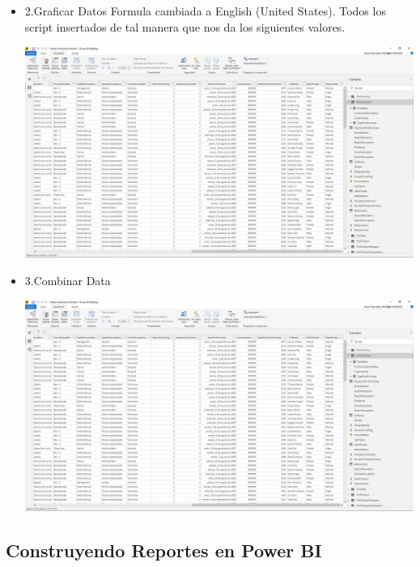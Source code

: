\begin{itemize}
 \item 2.Graficar Datos
Formula cambiada a English (United States). Todos los script insertados de tal manera que nos da los siguientes valores.
	\begin{center}
	\includegraphics[width=18cm]{./Imagenes/Imagen3}
	\end{center}	

 \item 3.Combinar Data

	\begin{center}
	\includegraphics[width=18cm]{./Imagenes/Imagen3}
	\end{center}	
\end{itemize}

\subsection {Construyendo Reportes en Power BI}







